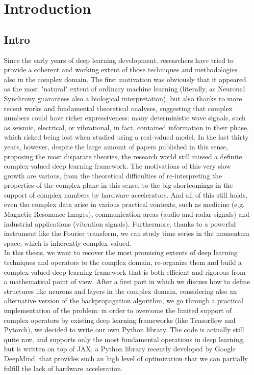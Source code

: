 \documentclass[../main.tex]{subfiles}
\begin{document}
\chapter{Introduction}

\section{Intro}
Since the early years of deep learning development, researchers have tried to provide a coherent and working extent of those techniques and methodologies also in the complex domain. The first motivation was obviously that it appeared as the most "natural" extent of ordinary machine learning (literally, as Neuronal Synchrony \cite{reichert2014neuronal} guarantees also a biological interpretation), but also thanks to more recent works and fundamental theoretical analyses, suggesting that complex numbers could have richer expressiveness: many deterministic wave signals, such as seismic, electrical, or vibrational, in fact, contained information in their phase, which risked being lost when studied using a real-valued model. In the last thirty years, however, despite the large amount of papers published in this sense, proposing the most disparate theories, the research world still missed a definite complex-valued deep learning framework. The motivations of this very slow growth are various, from the theoretical difficulties of re-interpreting the properties of the complex plane in this sense, to the big shortcomings in the support of complex numbers by hardware accelerators. And all of this still holds, even tho complex data arise in various practical contexts, such as medicine (e.g. Magnetic Resonance Images), communication areas (audio and radar signals) and industrial applications (vibration signals). Furthermore, thanks to a powerful instrument like the Fourier transform, we can study time series in the momentum space, which is inherently complex-valued.\\
In this thesis, we want to recover the most promising extents of deep learning techniques and operators to the complex domain, re-organize them and build a complex-valued deep learning framework that is both efficient and rigorous from a mathematical point of view. After a first part in which we discuss how to define structures like neurons and layers in the complex domain,
considering also an alternative version of the backpropagation algorithm, we go through a practical implementation of the problem: in order to overcome the limited support of complex operators by existing deep learning frameworks (like Tensorflow and Pytorch), we decided to write our own Python library. The code is actually still quite raw, and supports only the most fundamental operations in deep learning, but is written on top of JAX, a Python library recently developed by Google DeepMind, that provides such an high level of optimization that we can partially fulfill the lack of hardware acceleration.\\
\end{document}
